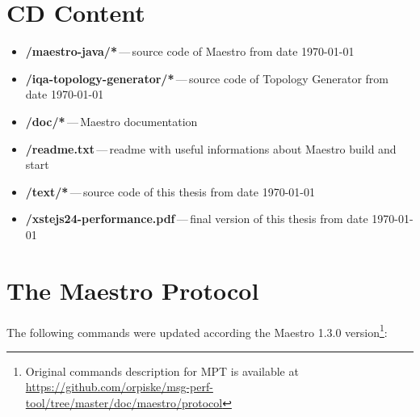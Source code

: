 

\chapter{CD Content}
\label{CD Content}

\begin{itemize}
  \item \textbf{/maestro-java/*}\,---\,source code of Maestro from date \today
  \item \textbf{/iqa-topology-generator/*}\,---\,source code of Topology Generator from date \today
  \item \textbf{/doc/*}\,---\,Maestro documentation
  \item \textbf{/readme.txt}\,---\,readme with useful informations about Maestro build and start
  \item \textbf{/text/*}\,---\,source code of this thesis from date \today
  \item \textbf{/xstejs24-performance.pdf}\,---\,final version of this thesis from date \today
\end{itemize}

\chapter{The Maestro Protocol}
\label{AP:commands}
The following commands were updated according the Maestro 1.3.0 version\footnote{Original commands description for MPT is available at \url{https://github.com/orpiske/msg-perf-tool/tree/master/doc/maestro/protocol}}:

